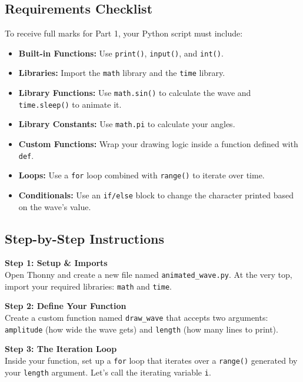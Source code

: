 \documentclass[11pt, a4paper]{article}
\begin{document}
\subsection*{Requirements Checklist}
To receive full marks for Part 1, your Python script must include:
\begin{itemize}
    \item \textbf{Built-in Functions:} Use \texttt{print()}, \texttt{input()}, and \texttt{int()}.
    \item \textbf{Libraries:} Import the \texttt{math} library and the \texttt{time} library.
    \item \textbf{Library Functions:} Use \texttt{math.sin()} to calculate the wave and \texttt{time.sleep()} to animate it.
    \item \textbf{Library Constants:} Use \texttt{math.pi} to calculate your angles.
    \item \textbf{Custom Functions:} Wrap your drawing logic inside a function defined with \texttt{def}.
    \item \textbf{Loops:} Use a \texttt{for} loop combined with \texttt{range()} to iterate over time.
    \item \textbf{Conditionals:} Use an \texttt{if/else} block to change the character printed based on the wave's value.
\end{itemize}

\subsection*{Step-by-Step Instructions}

\textbf{Step 1: Setup \& Imports}\\
Open Thonny and create a new file named \texttt{animated\_wave.py}. At the very top, import your required libraries: \texttt{math} and \texttt{time}.

\vspace{0.5em}
\textbf{Step 2: Define Your Function}\\
Create a custom function named \texttt{draw\_wave} that accepts two arguments: \texttt{amplitude} (how wide the wave gets) and \texttt{length} (how many lines to print).

\vspace{0.5em}
\textbf{Step 3: The Iteration Loop}\\
Inside your function, set up a \texttt{for} loop that iterates over a \texttt{range()} generated by your \texttt{length} argument. Let's call the iterating variable \texttt{i}.
\end{document}
